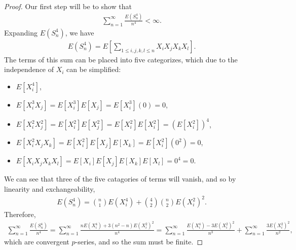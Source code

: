 \begin{proof}
    Our first step will be to show that
    \begin{align*}
        \sum_{n=1}^{\infty}\frac{E\left(S_n^4\right)}{n^4} < \infty.
    \end{align*}
    Expanding $E(S_n^4)$, we have
    \begin{align*}
        E(S_n^4) = E\left[\sum_{1 \leq i, j, k, l \leq n}X_iX_jX_kX_l\right].
    \end{align*}
    The terms of this sum can be placed into five categorizes, which due to the independence of $X_i$ can be simplified:
    \begin{itemize}
        \item $E\left[X_i^4\right]$,
        \item $E\left[X_i^3X_j\right] = E\left[X_i^3\right]E\left[X_j\right] = E\left[X_i^3\right](0) = 0$,
        \item $E\left[X_i^2X_j^2\right] = E\left[X_i^2\right]E\left[X_j^2\right] = E\left[X_i^2\right]E\left[X_i^2\right] = \left(E\left[X_i^2\right]\right)^4$,
        \item $E\left[X_i^2X_jX_k\right] = E\left[X_i^2\right]E\left[X_j\right]E\left[X_k\right] = E\left[X_i^2\right](0^2) = 0$,
        \item $E\left[X_iX_jX_kX_l\right] = E\left[X_i\right]E\left[X_j\right]E\left[X_k\right]E\left[X_l\right] = 0^4 = 0$.
    \end{itemize}
    We can see that three of the five catagories of terms will vanish, and so by linearity and exchangeability,
    \begin{align*}
        E\left(S_n^4\right) = \binom{n}{1}E\left(X_i^4\right) + \binom{4}{2}\binom{n}{2}E\left(X_i^2\right)^2.
    \end{align*}
    Therefore,
    \begin{align*}
        \sum_{n=1}^{\infty}\frac{E\left(S_n^4\right)}{n^4} = \sum_{n=1}^{\infty}\frac{nE\left(X_i^4\right) + 3(n^2 - n)E\left(X_i^2\right)^2}{n^4} = \sum_{n=1}^{\infty}\frac{E\left(X_i^4\right)- 3E\left(X_i^2\right)^2}{n^3} + \sum_{n=1}^{\infty}\frac{3E\left(X_i^2\right)^2}{n^2},
    \end{align*}
    which are convergent $p$-series, and so the sum must be finite.


\end{proof}
